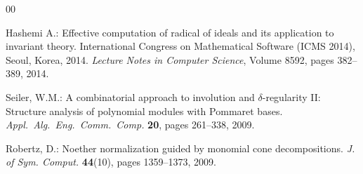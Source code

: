\documentclass[11pt]{article}
\begin{document}


\begin{thebibliography}{00}
\setlength{\itemsep}{-1mm}
\footnotesize

Hashemi A.: Effective computation of radical of ideals and its application to invariant theory. International Congress on Mathematical Software (ICMS 2014), Seoul, Korea, 2014. {\em Lecture Notes in Computer Science}, Volume 8592, pages 382--389, 2014.

Seiler, W.M.: A combinatorial approach to involution and $\delta$-regularity
  {II}: Structure analysis of polynomial modules with {P}ommaret bases. {\em Appl.\
  Alg.\ Eng.\ Comm.\ Comp.}  {\bf 20}, pages  261--338, 2009.

Robertz, D.: Noether normalization guided by monomial cone decompositions. {\em J. of Sym. Comput.}  {\bf 44}(10), pages  1359--1373, 2009.
\end{thebibliography}
\normalsize
\end{document}

